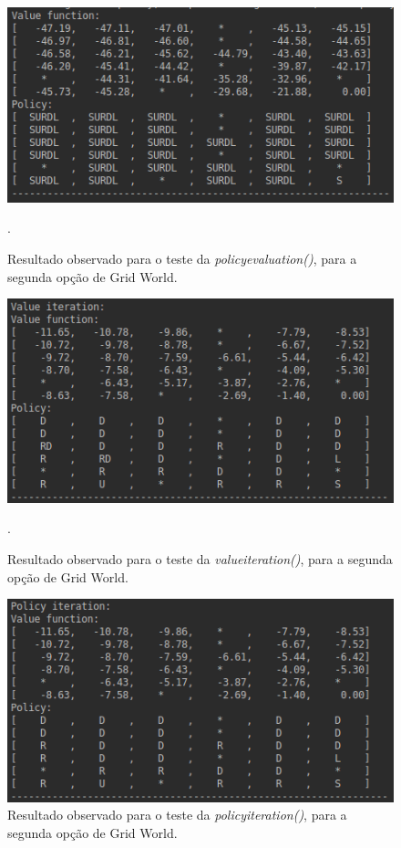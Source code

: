 \documentclass[conference]{IEEEtran}
\begin{document}
\begin{figure}[htbp]
\centering
\centerline{\includegraphics[scale=0.5]{imagens/grid2/policy_evaluation.png}}
\caption{Resultado observado para o teste da \textit{policy\underline{\space}evaluation()}, para a segunda opção de Grid World.}.
\label{grid2/policy_evaluation}
\end{figure}

\begin{figure}[htbp]
\centering
\centerline{\includegraphics[scale=0.5]{imagens/grid2/value_iteration.png}}
\caption{Resultado observado para o teste da \textit{value\underline{\space}iteration()}, para a segunda opção de Grid World.}.
\label{grid2/value_iteration}
\end{figure}

\begin{figure}[htbp]
\centering
\centerline{\includegraphics[scale=0.5]{imagens/grid2/policy_iteration.png}}
\caption{Resultado observado para o teste da \textit{policy\underline{\space}iteration()}, para a segunda opção de Grid World.}
\label{grid2/policy_iteration}
\end{figure}
\end{document}
